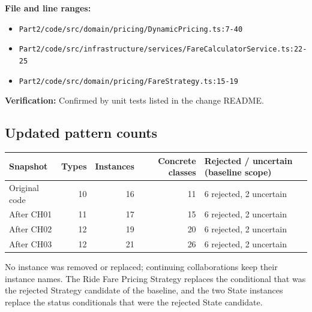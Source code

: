 \documentclass[11pt,a4paper]{article}
\begin{document}
\noindent\textbf{File and line ranges:}\begin{itemize}\setlength\itemsep{0pt}\item \texttt{Part2/\allowbreak{}code/\allowbreak{}src/\allowbreak{}domain/\allowbreak{}pricing/\allowbreak{}DynamicPricing.\allowbreak{}ts:7-40}\item \texttt{Part2/\allowbreak{}code/\allowbreak{}src/\allowbreak{}infrastructure/\allowbreak{}services/\allowbreak{}FareCalculatorService.\allowbreak{}ts:22-25}\item \texttt{Part2/\allowbreak{}code/\allowbreak{}src/\allowbreak{}domain/\allowbreak{}pricing/\allowbreak{}FareStrategy.\allowbreak{}ts:15-19}\end{itemize}
\noindent\textbf{Verification:} Confirmed by unit tests listed in the change README.


\subsection{Updated pattern counts}
\begin{tabular}{@{}lrrrl@{}}\toprule Snapshot & Types & Instances & Concrete classes & Rejected / uncertain (baseline scope)\\\midrule
Original code & 10 & 16 & 11 & 6 rejected, 2 uncertain \\
After CH01 & 11 & 17 & 15 & 6 rejected, 2 uncertain \\
After CH02 & 12 & 19 & 20 & 6 rejected, 2 uncertain \\
After CH03 & 12 & 21 & 26 & 6 rejected, 2 uncertain \\
\bottomrule\end{tabular}

No instance was removed or replaced; continuing collaborations keep their instance names. The Ride Fare Pricing Strategy replaces the
conditional that was the rejected Strategy candidate of the baseline, and the two State instances replace the status conditionals that
were the rejected State candidate.
\end{document}
